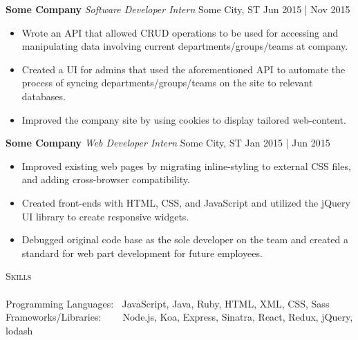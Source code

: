 \documentclass{article}
\newcommand{\lineunder} {
    \vspace*{-8pt} \\
    \hspace*{-18pt} \hrulefill \\
}
\newcommand{\header} [1] {
    {\hspace*{-18pt}\vspace*{6pt} \textsc{#1}}
    \vspace*{-6pt} \lineunder
}
\begin{document}
        \vspace{1mm}

        \textbf{Some Company} \hfill \textit{Software Developer Intern} \hfill Some City, ST \hfill Jun 2015 | Nov 2015 \\
        \begin{itemize} \itemsep 3pt
            \item Wrote an API that allowed CRUD operations to be used for accessing and manipulating data involving current departments/groups/teams at company.
            \item Created a UI for admins that used the aforementioned API to automate the process of syncing departments/groups/teams on the site to relevant databases.
            \item Improved the company site by using cookies to display tailored web-content.
        \end{itemize}

        \vspace{1mm}

        \textbf{Some Company} \hfill \textit{Web Developer Intern} \hfill Some City, ST \hfill Jan 2015 | Jun 2015 \\
        \begin{itemize} \itemsep 3pt
            \item Improved existing web pages by migrating inline-styling to external CSS files, and adding cross-browser compatibility.
            \item Created front-ends with HTML, CSS, and JavaScript and utilized the jQuery UI library to create responsive widgets.
            \item Debugged original code base as the sole developer on the team and created a standard for web part development for future employees.
        \end{itemize}

        \vspace{1mm}



    \header{Skills}

    {Programming Languages:} $\:$ JavaScript, Java, Ruby, HTML, XML, CSS, Sass \vspace{1mm}
    {\\Frameworks/Libraries:} $\:$ $\:$ $\:$ $\:$Node.js, Koa, Express, Sinatra, React, Redux, jQuery, lodash

    \vspace{4mm}
\end{document}
